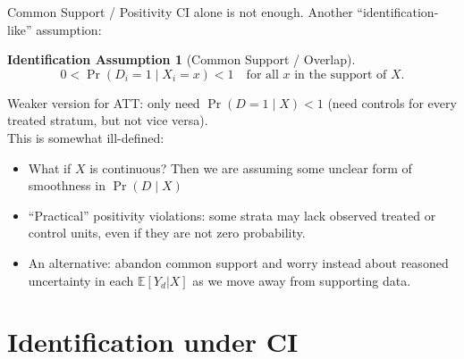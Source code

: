 \documentclass[xcolor=dvipsnames]{beamer}
\newcommand\E{\mathbb{E}}
\newtheorem{iass}{Identification Assumption}
\begin{document}
\begin{frame}{Common Support / Positivity}
\small
{} CI alone is not enough. Another ``identification-like'' assumption: 
\begin{iass}[Common Support / Overlap]
$$0 < \Pr(D_i = 1 \mid X_i = x) < 1 \quad \text{for all } x \text{ in the support of } X.$$
\end{iass}

 Weaker version for ATT: only need $\Pr(D = 1 \mid X) < 1$ (need controls for every treated stratum, but not vice versa).\\[4pt]
\medskip
{} This is somewhat ill-defined:
\footnotesize
\begin{itemize}
\item What if $X$ is continuous?  Then we are assuming some unclear form of smoothness in $\Pr(D\mid X)$
\item ``Practical'' positivity violations: some strata may lack observed treated or control units, even if they are not zero probability. 
\item An alternative: abandon common support and worry instead about reasoned uncertainty in each $\E[Y_d|X]$ as we move away from supporting data.
\end{itemize}

\end{frame}


\section{Identification under CI}
\end{document}
